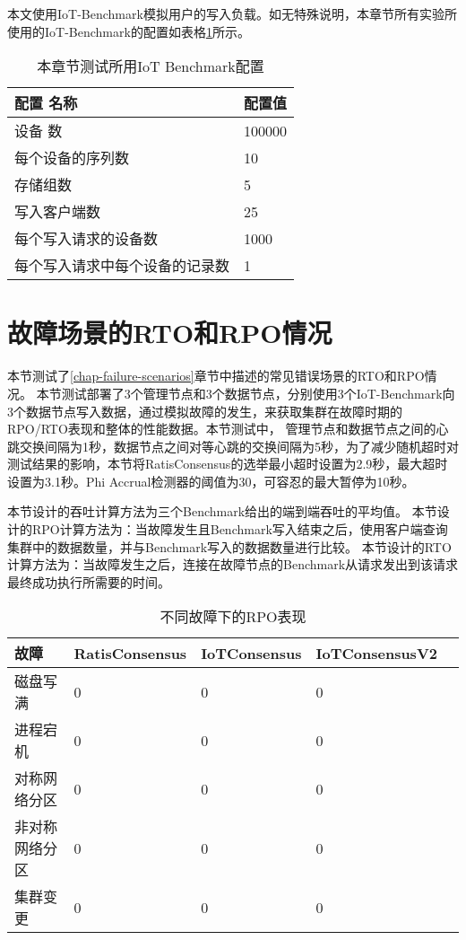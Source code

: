 本文使用IoT-Benchmark\cite{iot-benchmark}模拟用户的写入负载。如无特殊说明，本章节所有实验所使用的IoT-Benchmark的配置如表格\ref{tab:iot-benchmark-default}所示。

\begin{table}[h!]
    \centering
    \caption{本章节测试所用IoT Benchmark配置}
    \label{tab:iot-benchmark-default}
    \begin{tabular}{ll}
        \toprule
        配置 名称 & 配置值 \\
        \midrule
        设备 数 & 100000  \\
        每个设备的序列数 & 10   \\
        存储组数 & 5  \\
        写入客户端数 & 25  \\
        每个写入请求的设备数 & 1000  \\
        每个写入请求中每个设备的记录数 & 1 \\
        \bottomrule
    \end{tabular}
\end{table}

\section{故障场景的RTO和RPO情况}

本节测试了\ref{chap-failure-scenarios}章节中描述的常见错误场景的RTO和RPO情况。
本节测试部署了3个管理节点和3个数据节点，分别使用3个IoT-Benchmark向3个数据节点写入数据，通过模拟故障的发生，来获取集群在故障时期的RPO/RTO表现和整体的性能数据。本节测试中，
管理节点和数据节点之间的心跳交换间隔为1秒，数据节点之间对等心跳的交换间隔为5秒，为了减少随机超时对测试结果的影响，本节将RatisConsensus的选举最小超时设置为2.9秒，最大超时设置为3.1秒。Phi Accrual检测器的阈值为30，可容忍的最大暂停为10秒。


本节设计的吞吐计算方法为三个Benchmark给出的端到端吞吐的平均值。
本节设计的RPO计算方法为：当故障发生且Benchmark写入结束之后，使用客户端查询集群中的数据数量，并与Benchmark写入的数据数量进行比较。
本节设计的RTO计算方法为：当故障发生之后，连接在故障节点的Benchmark从请求发出到该请求最终成功执行所需要的时间。


\begin{table}[h!]
    \centering
    \caption{不同故障下的RPO表现}
    \label{tab:exp-rpo-overview}
    \begin{tabular}{@{}lllll@{}}
        \toprule
        故障 & RatisConsensus & IoTConsensus & IoTConsensusV2 \\
        \midrule
        磁盘写满 & 0 & 0 & 0  \\
        进程宕机 & 0 & 0 & 0  \\
        对称网络分区 & 0 & 0 & 0  \\
        非对称网络分区 & 0 & 0 & 0  \\
        集群变更 & 0 & 0 & 0  \\
        \bottomrule
    \end{tabular}
  \end{table}

